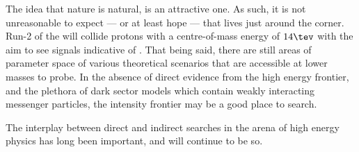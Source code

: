 The idea that nature is natural, is an attractive one.
As such, it is not unreasonable to expect --- or at least hope --- that \np lives just
around the corner.
Run-2 of the \lhc will collide protons with a centre-of-mass energy of $14\tev$ with the aim to see
signals indicative of \np.
That being said, there are still areas of parameter space of various theoretical scenarios that are
accessible at lower masses to probe.
In the absence of direct evidence from the high energy frontier, and
the plethora of dark sector models which contain weakly interacting messenger particles, the
intensity frontier may be a good place to search.

The interplay between direct and indirect searches in the arena of high energy physics
has long been important, and will continue to be so.






%
%
%
%
%








